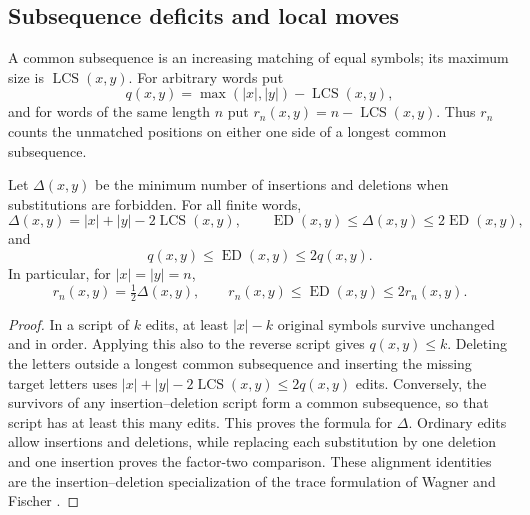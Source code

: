 \subsection{Subsequence deficits and local moves}

A common subsequence is an increasing matching of equal symbols; its
maximum size is $\operatorname{LCS}(x,y)$.  For arbitrary words put
\[
 q(x,y)=\max(|x|,|y|)-\operatorname{LCS}(x,y),
\]
and for words of the same length $n$ put
$r_n(x,y)=n-\operatorname{LCS}(x,y)$.  Thus $r_n$ counts the unmatched
positions on either one side of a longest common subsequence.

\begin{lemma}\label{upper:metric}
Let $\Delta(x,y)$ be the minimum number of insertions and deletions when
substitutions are forbidden.  For all finite words,
\[
 \Delta(x,y)=|x|+|y|-2\operatorname{LCS}(x,y),\qquad
 \operatorname{ED}(x,y)\le\Delta(x,y)\le2\operatorname{ED}(x,y),
\]
and
\begin{equation}\label{upper:unequal-comparison}
 q(x,y)\le\operatorname{ED}(x,y)\le2q(x,y).
\end{equation}
In particular, for $|x|=|y|=n$,
\begin{equation}\label{upper:deficit-comparison}
 r_n(x,y)=\tfrac12\Delta(x,y),\qquad
 r_n(x,y)\le\operatorname{ED}(x,y)\le2r_n(x,y).
\end{equation}
\end{lemma}
\begin{proof}
In a script of $k$ edits, at least $|x|-k$ original symbols survive
unchanged and in order.  Applying this also to the reverse script gives
$q(x,y)\le k$.  Deleting the letters outside a longest common subsequence
and inserting the missing target letters uses
$|x|+|y|-2\operatorname{LCS}(x,y)\le2q(x,y)$ edits.  Conversely, the
survivors of any insertion--deletion script form a common subsequence,
so that script has at least this many edits.  This proves the formula for
$\Delta$.  Ordinary edits allow insertions and deletions, while replacing
each substitution by one deletion and one insertion proves the factor-two
comparison.  These alignment identities are the insertion--deletion
specialization of the trace formulation of Wagner and Fischer
\cite[Sections~3 and~5]{WagnerFischer1974}.
\end{proof}

